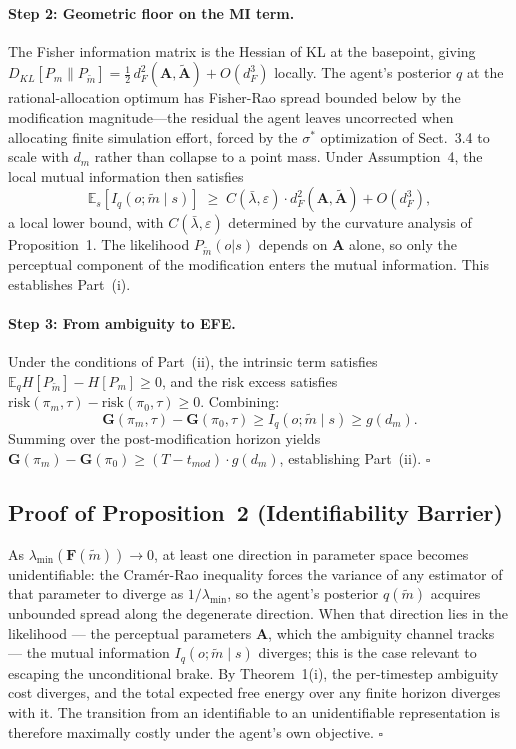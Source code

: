 \documentclass[runningheads]{llncs}
\begin{document}
\paragraph{Step 2: Geometric floor on the MI term.}
The Fisher information matrix
is the Hessian of KL at the basepoint, giving $D_{KL}[P_m \| P_{\tilde m}] =
\tfrac{1}{2}\, d_F^2(\mathbf{A}, \tilde{\mathbf{A}}) + O(d_F^3)$ locally. The agent's posterior $q$ at the
rational-allocation optimum has Fisher-Rao spread bounded below by the
modification magnitude---the residual the agent leaves uncorrected when
allocating finite simulation effort, forced by the $\sigma^*$ optimization of
Sect.~3.4 to scale with $d_m$ rather than collapse
to a point mass. Under Assumption~4, the local mutual
information then satisfies
\begin{equation}
\mathbb{E}_s\!\left[I_q(o; \tilde m \mid s)\right]
  \;\geq\; C(\bar\lambda, \varepsilon)\cdot d_F^2(\mathbf{A}, \tilde{\mathbf{A}}) + O(d_F^3),
\end{equation}
a local lower bound, with $C(\bar\lambda, \varepsilon)$ determined by the
curvature analysis of Proposition~1. The likelihood
$P_{\tilde m}(o|s)$ depends on $\mathbf{A}$ alone, so only the perceptual
component of the modification enters the mutual information. This establishes
Part~(i).

\paragraph{Step 3: From ambiguity to EFE.}
Under the conditions of Part~(ii), the intrinsic term satisfies $\mathbb{E}_q H[P_{\tilde{m}}] - H[P_m] \geq 0$, and the risk excess satisfies $\mathrm{risk}(\pi_m, \tau) - \mathrm{risk}(\pi_0, \tau) \geq 0$. Combining:
\begin{equation}
\mathbf{G}(\pi_m, \tau) - \mathbf{G}(\pi_0, \tau) \geq I_q(o; \tilde{m} \mid s) \geq g(d_m).
\end{equation}
Summing over the post-modification horizon yields $\mathbf{G}(\pi_m) - \mathbf{G}(\pi_0) \geq (T - t_{mod}) \cdot g(d_m)$, establishing Part~(ii). $\square$

\subsection{Proof of Proposition~2 (Identifiability Barrier)}

As $\lambda_{\min}(\mathbf{F}(\tilde{m})) \to 0$, at least one direction in parameter space becomes unidentifiable: the Cram\'er-Rao inequality forces the variance of any estimator of that parameter to diverge as $1/\lambda_{\min}$, so the agent's posterior $q(\tilde{m})$ acquires unbounded spread along the degenerate direction. When that direction lies in the likelihood --- the perceptual parameters $\mathbf{A}$, which the ambiguity channel tracks --- the mutual information $I_q(o; \tilde{m} \mid s)$ diverges; this is the case relevant to escaping the unconditional brake. By Theorem~1(i), the per-timestep ambiguity cost diverges, and the total expected free energy over any finite horizon diverges with it. The transition from an identifiable to an unidentifiable representation is therefore maximally costly under the agent's own objective. $\square$
\end{document}
